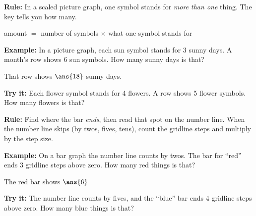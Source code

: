 \documentclass[12pt]{article}
\begin{document}


\begin{formulabox}
\textbf{Rule:} In a scaled picture graph, one symbol stands for \emph{more
than one} thing. The key tells you how many. \par
amount $=$ number of symbols $\times$ what one symbol stands for
\end{formulabox}

\begin{examplebox}
\textbf{Example:} In a picture graph, each sun symbol stands for 3 sunny
days. A month's row shows 6 sun symbols. How many sunny days is that?

That row shows $\ans{18}$ sunny days.
\end{examplebox}

\begin{tryitbox}
\textbf{Try it:} Each flower symbol stands for 4 flowers. A row shows
5 flower symbols. How many flowers is that?\\[2pt]
\end{tryitbox}


\begin{formulabox}
\textbf{Rule:} Find where the bar \emph{ends}, then read that spot on the
number line. When the number line skips (by twos, fives, tens), count the
gridline steps and multiply by the step size.
\end{formulabox}

\begin{examplebox}
\textbf{Example:} On a bar graph the number line counts by twos. The bar for
``red'' ends 3 gridline steps above zero. How many red things is that?

The red bar shows $\ans{6}$
\end{examplebox}

\begin{tryitbox}
\textbf{Try it:} The number line counts by fives, and the ``blue'' bar ends
4 gridline steps above zero. How many blue things is that?\\[2pt]
\end{tryitbox}
\end{document}

